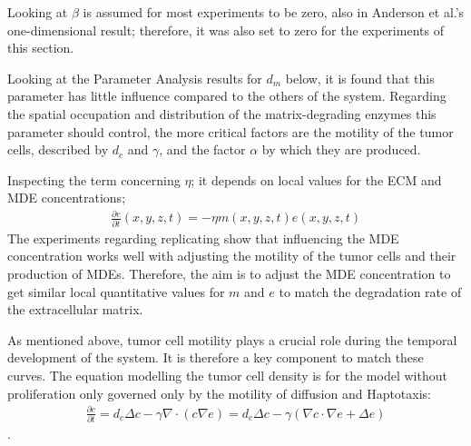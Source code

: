 Looking at $\beta$ is assumed for most experiments to be zero, also in Anderson et al.'s one-dimensional result; therefore, it was also set to zero for the experiments of this section. 

Looking at the Parameter Analysis results for $d_m$ below, it is found that this parameter has little influence compared to the others of the system. Regarding the spatial occupation and distribution of the matrix-degrading enzymes this parameter should control, the more critical factors are the motility of the tumor cells, described by $d_c$ and $\gamma$, and the factor $\alpha$ by which they are produced. 

Inspecting the term concerning $\eta$; it depends on local values for the ECM and MDE concentrations; 
\begin{align*}
    \frac{\partial e}{\partial t}(x,y,z,t)=-\eta m(x,y,z,t)e(x,y,z,t)
\end{align*}    
The experiments regarding replicating show that influencing the MDE concentration works well with adjusting the motility of the tumor cells and their production of MDEs. Therefore, the aim is to adjust the MDE concentration to get similar local quantitative values for $m$ and $e$ to match the degradation rate of the extracellular matrix.

As mentioned above, tumor cell motility plays a crucial role during the temporal development of the system. It is therefore a key component to match these curves. The equation modelling the tumor cell density is for the model without proliferation only governed only by the motility of diffusion and Haptotaxis: 
\begin{align*}
    \frac{\partial c}{\partial t} = d_c\Delta c - \gamma \nabla\cdot (c\nabla e)=d_c\Delta c - \gamma (\nabla c \cdot \nabla e + \Delta e)
\end{align*}.

